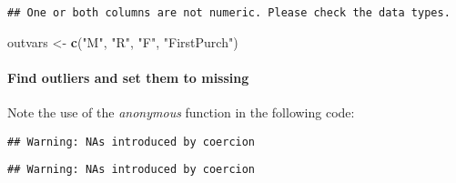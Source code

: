 \documentclass[
]{article}
\newenvironment{Shaded}{\begin{snugshade}}{\end{snugshade}}
\newcommand{\CommentTok}[1]{\textcolor[rgb]{0.56,0.35,0.01}{\textit{#1}}}
\newcommand{\ConstantTok}[1]{\textcolor[rgb]{0.56,0.35,0.01}{#1}}
\newcommand{\DecValTok}[1]{\textcolor[rgb]{0.00,0.00,0.81}{#1}}
\newcommand{\FunctionTok}[1]{\textcolor[rgb]{0.13,0.29,0.53}{\textbf{#1}}}
\newcommand{\NormalTok}[1]{#1}
\newcommand{\OtherTok}[1]{\textcolor[rgb]{0.56,0.35,0.01}{#1}}
\newcommand{\SpecialCharTok}[1]{\textcolor[rgb]{0.81,0.36,0.00}{\textbf{#1}}}
\newcommand{\StringTok}[1]{\textcolor[rgb]{0.31,0.60,0.02}{#1}}
\begin{document}
\begin{verbatim}
## One or both columns are not numeric. Please check the data types.
\end{verbatim}

\begin{Shaded}
\begin{Highlighting}[]
\NormalTok{outvars }\OtherTok{\textless{}{-}} \FunctionTok{c}\NormalTok{(}\StringTok{"M"}\NormalTok{, }\StringTok{"R"}\NormalTok{, }\StringTok{"F"}\NormalTok{, }\StringTok{"FirstPurch"}\NormalTok{)}
\end{Highlighting}
\end{Shaded}

\paragraph{Find outliers and set them to
missing}\label{find-outliers-and-set-them-to-missing}

Note the use of the \emph{anonymous} function in the following code:

\begin{Shaded}
\end{Shaded}

\begin{verbatim}
## Warning: NAs introduced by coercion
\end{verbatim}

\begin{Shaded}
\end{Shaded}

\begin{verbatim}
## Warning: NAs introduced by coercion
\end{verbatim}

\begin{Shaded}
\end{Shaded}
\end{document}
